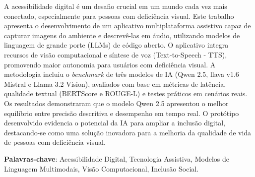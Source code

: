 \begin{resumo}


	
A acessibilidade digital é um desafio crucial em um mundo cada vez mais conectado, especialmente para pessoas com deficiência visual. Este trabalho apresenta o desenvolvimento de um aplicativo multiplataforma assistivo capaz de capturar imagens do ambiente e descrevê-las em áudio, utilizando modelos de linguagem de grande porte (LLMs) de código aberto. O aplicativo integra recursos de visão computacional e síntese de voz (Text-to-Speech - TTS), promovendo maior autonomia para usuários com deficiência visual. A metodologia incluiu o \textit{benchmark} de três modelos de IA (Qwen 2.5, llava v1.6 Mistral e Llama 3.2 Vision), avaliados com base em métricas de latência, qualidade textual (BERTScore e ROUGE-L) e testes práticos em cenários reais. Os resultados demonstraram que o modelo Qwen 2.5 apresentou o melhor equilíbrio entre precisão descritiva e desempenho em tempo real. O protótipo desenvolvido evidencia o potencial da IA para ampliar a inclusão digital, destacando-se como uma solução inovadora para a melhoria da qualidade de vida de pessoas com deficiência visual.

	\vspace{\onelineskip}
	
	\textbf{Palavras-chave}: Acessibilidade Digital, Tecnologia Assistiva, Modelos de Linguagem Multimodais, Visão Computacional, Inclusão Social.
	
\end{resumo}